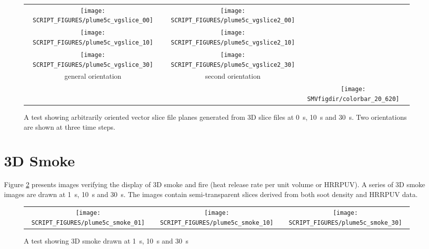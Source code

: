 \documentclass[11pt,twoside]{book}
\begin{document}
\begin{figure}[bph]
\begin{center}
\begin{tabular}{cccp{1.0in}}
 \texttt{[image: SCRIPT\_FIGURES/plume5c\_vgslice\_00]}&
 \texttt{[image: SCRIPT\_FIGURES/plume5c\_vgslice2\_00]}\\

 \texttt{[image: SCRIPT\_FIGURES/plume5c\_vgslice\_10]}&
 \texttt{[image: SCRIPT\_FIGURES/plume5c\_vgslice2\_10]}\\

 \texttt{[image: SCRIPT\_FIGURES/plume5c\_vgslice\_30]}&
 \texttt{[image: SCRIPT\_FIGURES/plume5c\_vgslice2\_30]}\\

 general orientation&second orientation\\
 &&\raisebox{0.5in}[0pt]{\texttt{[image: \\SMVfigdir/colorbar\_20\_620]}}\\
 \end{tabular}
\end{center}
 \caption[A test showing arbitrarily oriented vector slice file planes generated from
 3D slice files]{A test showing arbitrarily oriented vector slice file planes generated
 from 3D slice files at \SI{0}{s}, \SI{10}{s} and \SI{30}{s}.  Two orientations are
 shown at three time steps. }
\label{figvgslicetest}%
\end{figure}

\clearpage

\section{3D Smoke}

Figure \ref{figsmoketest} presents images verifying the display of 3D smoke and fire
(heat release rate per unit volume or HRRPUV). A series of 3D smoke images are drawn
at \SI{1}{s}, \SI{10}{s} and \SI{30}{s}.  The images contain semi-transparent slices
derived from both soot density and HRRPUV data.

\begin{figure}[bph]
\begin{center}
\begin{tabular}{ccc}
 \texttt{[image: SCRIPT\_FIGURES/plume5c\_smoke\_01]}&
 \texttt{[image: SCRIPT\_FIGURES/plume5c\_smoke\_10]}&
 \texttt{[image: SCRIPT\_FIGURES/plume5c\_smoke\_30]}
\end{tabular}
\end{center}
 \caption{A test showing 3D smoke drawn at \SI{1}{s}, \SI{10}{s} and \SI{30}{s}}
\label{figsmoketest}%
\end{figure}
\end{document}
